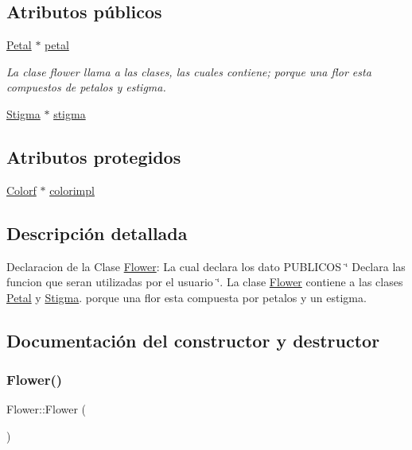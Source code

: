 \subsection*{Atributos públicos}
\begin{DoxyCompactItemize}
\item 
\mbox{\hyperlink{class_petal}{Petal}} $\ast$ \mbox{\hyperlink{class_flower_af0f1dc8c951cb056cf77409ca06d96f7}{petal}}
\begin{DoxyCompactList}\small\item\em La clase flower llama a las clases, las cuales contiene; porque una flor esta compuestos de petalos y estigma. \end{DoxyCompactList}\item 
\mbox{\hyperlink{class_stigma}{Stigma}} $\ast$ \mbox{\hyperlink{class_flower_a691f3890594faacb64c9cea88be1c8d0}{stigma}}
\end{DoxyCompactItemize}
\subsection*{Atributos protegidos}
\begin{DoxyCompactItemize}
\item 
\mbox{\hyperlink{class_colorf}{Colorf}} $\ast$ \mbox{\hyperlink{class_flower_a4d27938dc8f29b7311a8a31093cb5ce4}{colorimpl}}
\end{DoxyCompactItemize}


\subsection{Descripción detallada}
Declaracion de la Clase \mbox{\hyperlink{class_flower}{Flower}}\+: La cual declara los dato P\+U\+B\+L\+I\+C\+OS \char`\"{} Declara las funcion que seran utilizadas por el usuario \char`\"{}. La clase \mbox{\hyperlink{class_flower}{Flower}} contiene a las clases \mbox{\hyperlink{class_petal}{Petal}} y \mbox{\hyperlink{class_stigma}{Stigma}}. porque una flor esta compuesta por petalos y un estigma. 

\subsection{Documentación del constructor y destructor}
\mbox{\label{class_flower_a24f3f77559b3a76509febf7392413ff7}} 
\subsubsection{\texorpdfstring{Flower()}{Flower()}}
{\footnotesize\ttfamily Flower\+::\+Flower (\begin{DoxyParamCaption}{ }\end{DoxyParamCaption})\hspace{0.3cm}{\ttfamily [inline]}}



